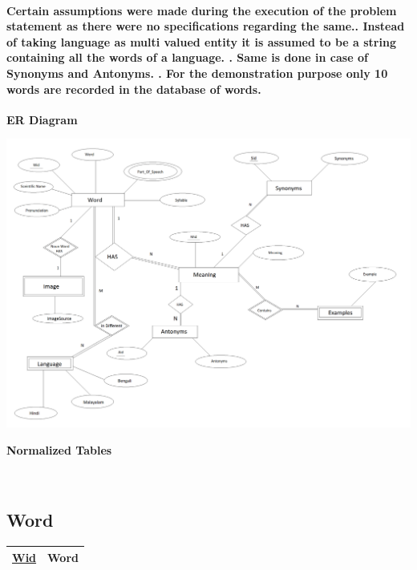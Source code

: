 \documentclass{article}
\begin{document}
\paragraph{Certain assumptions were made during the execution of the problem statement as there were no specifications regarding the same.. Instead of  taking language as multi valued entity it is assumed to be a string containing all the words of a language. . Same is done in case of Synonyms and Antonyms. . For the demonstration purpose only 10 words are recorded in the database of words.\newline\newline\newline}
\huge \textbf{ER Diagram}\newline\hline
\begin{center}
    \includegraphics[width=1.3\textwidth]{ER_Diagram.png}
\end{center}
\pagebreak
\huge \textbf{Normalized Tables}\newline
\hline

\\
\subsection*{Word}
{\selectfont

\begin{center}
\begin{tabular}{ |c|c| } 
 \hline
\large\underline{{Wid}} & \large{Word }\\  
 \hline
\end{tabular}
\end{center}
\newline
}
\end{document}
